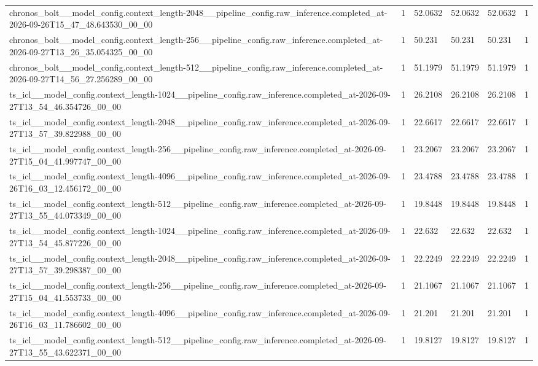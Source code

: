 \begin{tabular}{llllll}
chronos\_bolt\_\_model\_config.context\_length-2048\_\_pipeline\_config.raw\_inference.completed\_at-2026-09-26T15\_47\_48.643530\_00\_00 & 1 & 52.0632 & 52.0632 & 52.0632 & 1 \\
chronos\_bolt\_\_model\_config.context\_length-256\_\_pipeline\_config.raw\_inference.completed\_at-2026-09-27T13\_26\_35.054325\_00\_00 & 1 & 50.231 & 50.231 & 50.231 & 1 \\
chronos\_bolt\_\_model\_config.context\_length-512\_\_pipeline\_config.raw\_inference.completed\_at-2026-09-27T14\_56\_27.256289\_00\_00 & 1 & 51.1979 & 51.1979 & 51.1979 & 1 \\
ts\_icl\_\_model\_config.context\_length-1024\_\_pipeline\_config.raw\_inference.completed\_at-2026-09-27T13\_54\_46.354726\_00\_00 & 1 & 26.2108 & 26.2108 & 26.2108 & 1 \\
ts\_icl\_\_model\_config.context\_length-2048\_\_pipeline\_config.raw\_inference.completed\_at-2026-09-27T13\_57\_39.822988\_00\_00 & 1 & 22.6617 & 22.6617 & 22.6617 & 1 \\
ts\_icl\_\_model\_config.context\_length-256\_\_pipeline\_config.raw\_inference.completed\_at-2026-09-27T15\_04\_41.997747\_00\_00 & 1 & 23.2067 & 23.2067 & 23.2067 & 1 \\
ts\_icl\_\_model\_config.context\_length-4096\_\_pipeline\_config.raw\_inference.completed\_at-2026-09-26T16\_03\_12.456172\_00\_00 & 1 & 23.4788 & 23.4788 & 23.4788 & 1 \\
ts\_icl\_\_model\_config.context\_length-512\_\_pipeline\_config.raw\_inference.completed\_at-2026-09-27T13\_55\_44.073349\_00\_00 & 1 & 19.8448 & 19.8448 & 19.8448 & 1 \\
ts\_icl\_\_model\_config.context\_length-1024\_\_pipeline\_config.raw\_inference.completed\_at-2026-09-27T13\_54\_45.877226\_00\_00 & 1 & 22.632 & 22.632 & 22.632 & 1 \\
ts\_icl\_\_model\_config.context\_length-2048\_\_pipeline\_config.raw\_inference.completed\_at-2026-09-27T13\_57\_39.298387\_00\_00 & 1 & 22.2249 & 22.2249 & 22.2249 & 1 \\
ts\_icl\_\_model\_config.context\_length-256\_\_pipeline\_config.raw\_inference.completed\_at-2026-09-27T15\_04\_41.553733\_00\_00 & 1 & 21.1067 & 21.1067 & 21.1067 & 1 \\
ts\_icl\_\_model\_config.context\_length-4096\_\_pipeline\_config.raw\_inference.completed\_at-2026-09-26T16\_03\_11.786602\_00\_00 & 1 & 21.201 & 21.201 & 21.201 & 1 \\
ts\_icl\_\_model\_config.context\_length-512\_\_pipeline\_config.raw\_inference.completed\_at-2026-09-27T13\_55\_43.622371\_00\_00 & 1 & 19.8127 & 19.8127 & 19.8127 & 1 \\

\end{tabular}
